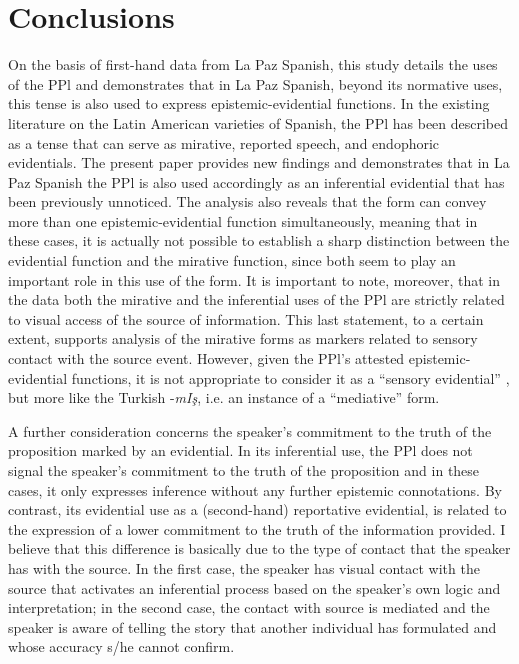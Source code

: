 \documentclass[output=paper]{langsci/langscibook}
\begin{document}
\section{Conclusions}\label{s:gq5}

On the basis of first-hand data from La Paz Spanish, this study details the uses of the PPl and demonstrates that in La Paz Spanish, beyond its normative uses, this tense is also used to express epistemic-evidential functions. In the existing literature on the Latin American varieties of Spanish, the PPl has been described as a tense that can serve as mirative, reported speech, and endophoric evidentials. The present paper provides new findings and demonstrates that in La Paz Spanish the PPl is also used accordingly as an inferential evidential that has been previously unnoticed. The analysis also reveals that the form can convey more than one epistemic-evidential function simultaneously, meaning that in these cases, it is actually not possible to establish a sharp distinction between the evidential function and the mirative function, since both seem to play an important role in this use of the form. It is important to note, moreover, that in the data both the mirative and the inferential uses of the PPl are strictly related to visual access of the source of information. This last statement, to a certain extent, supports  analysis of the mirative forms as markers related to sensory contact with the source event. However, given the PPl’s attested epistemic-evidential functions, it is not appropriate to consider it as a “sensory evidential” \citep{Hill2012}, but more like the Turkish -\textit{mIş}, i.e. an instance of a “mediative” \citep{Lazard1999} form.

 A further consideration concerns the speaker’s commitment to the truth of the proposition marked by an evidential. In its inferential use, the PPl does not signal the speaker’s commitment to the truth of the proposition and in these cases, it only expresses inference without any further epistemic connotations. By contrast, its evidential use as a (second-hand) reportative evidential, is related to the expression of a lower commitment to the truth of the information provided. I believe that this difference is basically due to the type of contact that the speaker has with the source. In the first case, the speaker has visual contact with the source that activates an inferential process based on the speaker’s own logic and interpretation; in the second case, the contact with source is mediated and the speaker is aware of telling the story that another individual has formulated and whose accuracy s/he cannot confirm. 
\end{document}
